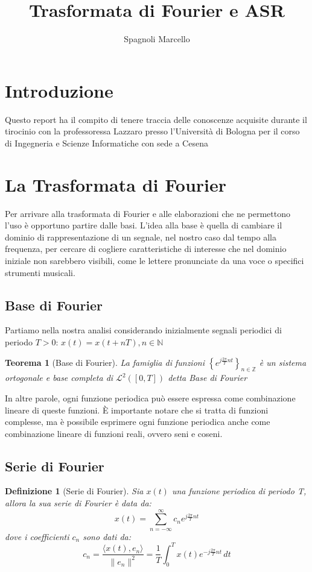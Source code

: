 \documentclass[12pt, a4paper]{article}
\title{Trasformata di Fourier e ASR}
\author{Spagnoli Marcello}
\date{}
\newtheorem*{theorem}{Teorema}
\newtheorem*{definition}{Definizione}
\begin{document}
\maketitle

\tableofcontents %
\newpage         %

\section{Introduzione}
Questo report ha il compito di tenere traccia delle conoscenze acquisite durante il tirocinio con la professoressa Lazzaro presso l'Università di Bologna per il corso di Ingegneria e Scienze Informatiche con sede a Cesena

\section{La Trasformata di Fourier}
Per arrivare alla trasformata di Fourier e alle elaborazioni che ne permettono l'uso è opportuno partire dalle basi.
L'idea alla base è quella di cambiare il dominio di rappresentazione di un segnale, nel nostro caso dal tempo alla frequenza, per cercare di cogliere caratteristiche di interesse che nel dominio iniziale non sarebbero visibili, come le lettere pronunciate da una voce o specifici strumenti musicali. \medskip

\subsection{Base di Fourier}
Partiamo nella nostra analisi considerando inizialmente segnali periodici di periodo $T > 0$: $x(t)=x(t + nT), n \in \mathbb{N}$

\begin{theorem}[Base di Fourier]

  La famiglia di funzioni $\left\{ e^{j \frac{2\pi}{T} nt} \right\}_{n \in \mathbb{Z}}$ è un sistema ortogonale e base completa di $\mathcal{L}^2([0, T])$ detta Base di Fourier
\end{theorem}

In altre parole, ogni funzione periodica può essere espressa come combinazione lineare di queste funzioni. È importante notare che si tratta di funzioni complesse, ma è possibile esprimere ogni funzione periodica anche come combinazione lineare di funzioni reali, ovvero seni e coseni.

\subsection{Serie di Fourier}
\begin{definition}[Serie di Fourier]

  Sia $x(t)$ una funzione periodica di periodo T, allora la sua serie di Fourier è data da:
  \[
    x(t) = \sum_{n=-\infty}^{\infty} c_n e^{j \frac{2\pi}{T} nt}
  \]
  dove i coefficienti $c_n$ sono dati da:
  \[
    c_n = \frac{\langle x(t), e_n \rangle}{\| e_n \|^2} = \frac{1}{T} \int_0^T x(t) e^{-j \frac{2\pi}{T} nt} \, dt
  \]

\end{definition}
\end{document}
